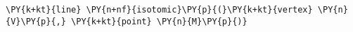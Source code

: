 \begin{Verbatim}[commandchars=\\\{\}]
    \PY{k+kt}{line} \PY{n+nf}{isotomic}\PY{p}{(}\PY{k+kt}{vertex} \PY{n}{V}\PY{p}{,} \PY{k+kt}{point} \PY{n}{M}\PY{p}{)}
\end{Verbatim}
